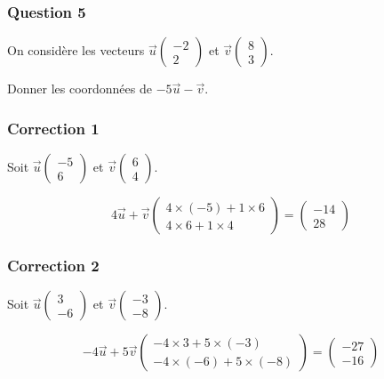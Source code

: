 \documentclass[15pt, mathserif]{beamer}
\begin{document}
\begin{frame} 
	\frametitle{Question 5}
On considère les vecteurs $\vec{u} \begin{pmatrix} -2 \\ 2 \end{pmatrix}$ et $\vec{v} \begin{pmatrix} 8 \\ 3 \end{pmatrix}$. 
 
 Donner les coordonnées de $-5\vec{u}-\vec{v}$.\end{frame}


\begin{frame}
\vspace{-10mm}
	\frametitle{Correction 1}
Soit $\vec{u} \begin{pmatrix} -5 \\ 6 \end{pmatrix}$ et $\vec{v} \begin{pmatrix} 6 \\ 4 \end{pmatrix}$. 
 
 $$4\vec{u}+\vec{v}\begin{pmatrix} 4 \times \left(-5\right)+1 \times 6\\  4 \times 6+1 \times 4\end{pmatrix}=\begin{pmatrix}-14 \\ 28\end{pmatrix}$$\end{frame}


\begin{frame}
\vspace{-10mm}
	\frametitle{Correction 2}
Soit $\vec{u} \begin{pmatrix} 3 \\ -6 \end{pmatrix}$ et $\vec{v} \begin{pmatrix} -3 \\ -8 \end{pmatrix}$. 
 
 $$-4\vec{u}+5\vec{v}\begin{pmatrix} -4 \times 3+5 \times \left(-3\right)\\  -4 \times \left(-6\right)+5 \times \left(-8\right)\end{pmatrix}=\begin{pmatrix}-27 \\ -16\end{pmatrix}$$\end{frame}
\end{document}
